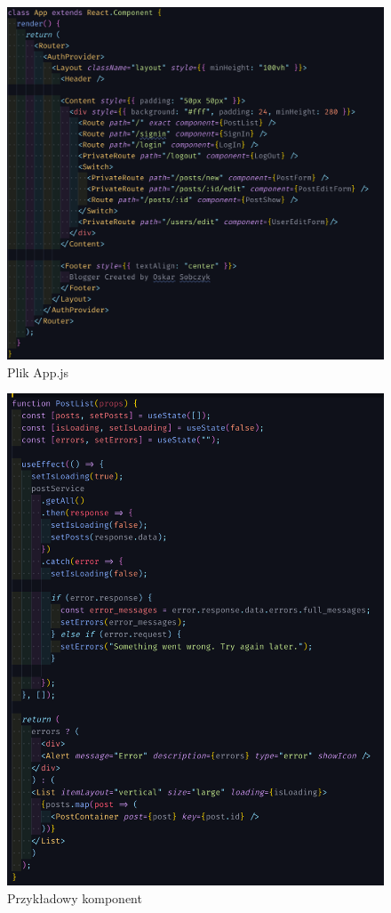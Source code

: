 \documentclass[declaration,shortabstract]{iithesis}
\begin{document}
\begin{figure}
    \centering
    \includegraphics[width=\textwidth]{images/appjs.png}
    \caption{Plik App.js}
    \label{fig:app.js}
\end{figure}

\begin{figure}
    \centering
    \includegraphics[width=\textwidth]{images/komponent1.png}
    \caption{Przykładowy komponent}
    \label{fig:komponent1}
\end{figure}
\end{document}

